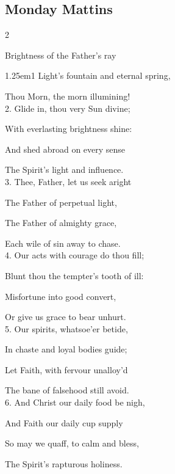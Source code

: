 \subsection{Monday Mattins}\label{MondayMattins}

\vspace{-1\baselineskip}

\begin{multicols}{2}
\sloppy

 Brightness of the Father's ray


\begin{hangparas}{1.25em}{1}
Light's fountain and eternal spring,

Thou Morn, the morn illumining!\\

2. Glide in, thou very Sun divine;

With everlasting brightness shine:

And shed abroad on every sense

The Spirit's light and influence.\\

3. Thee, Father, let us seek aright

The Father of perpetual light,

The Father of almighty grace,

Each wile of sin away to chase.\\

4. Our acts with courage do thou fill;

Blunt thou the tempter's tooth of ill:

Misfortune into good convert,

Or give us grace to bear unhurt.\\

5. Our spirits, whatsoe'er betide,

In chaste and loyal bodies guide;

Let Faith, with fervour unalloy'd

The bane of falsehood still avoid.\\

6. And Christ our daily food be nigh,

And Faith our daily cup supply

So may we quaff, to calm and bless,

The Spirit's rapturous holiness.\\


\end{hangparas}
\end{multicols}

